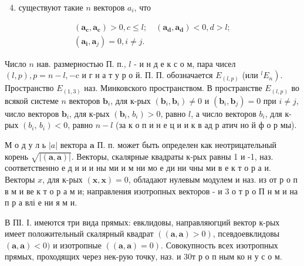 \documentclass[10pt]{article}
\begin{document}
\begin{enumerate}

  \setcounter{enumi}{3}

  \item существуют такие $n$ векторов $a_{i}$, что

\end{enumerate}



\[

\begin{gathered}

\left(\boldsymbol{a}_{\boldsymbol{c}}, \boldsymbol{a}_{\boldsymbol{c}}\right)>0, c \leqslant l ; \quad\left(\boldsymbol{a}_{\boldsymbol{d}}, \boldsymbol{a}_{\boldsymbol{d}}\right)<0, d>l ; \\

\left(\boldsymbol{a}_{\boldsymbol{i}}, \boldsymbol{a}_{j}\right)=0, i \neq j .

\end{gathered}

\]



Число $n$ нав. размерностью П. п., $l$ - и н д е к с о м, пара чисел $(l, p), p=n-l,-\mathrm{c}$ и г н а т у р о й. П. П. обозначается $E_{(l, p)}$ (или $\left.{ }^{l} E_{n}\right)$. Пространство $E_{(1,3)}$ наз. Минковского пространством. В пространстве $E_{(l, p)}$ во всякой системе $n$ векторов $\boldsymbol{b}_{i}$, для к-рых $\left(\boldsymbol{b}_{i}, \boldsymbol{b}_{i}\right) \neq 0$ и $\left(\boldsymbol{b}_{i}, \boldsymbol{b}_{j}\right)=0$ при $i \neq j$, число векторов $\boldsymbol{b}_{i}$, для к-рых $\left(\boldsymbol{b}_{i}\right.$, $\left.b_{i}\right)>0$, равно $l$, а число векторов $b_{i}$, для к-рых $\left(b_{i}\right.$, $\left.b_{i}\right)<0$, равно $n-l$ (за к о п и н е ц и и к в ад р атич но й ф о р мы).



М о д у л ь $|a|$ вектора $\boldsymbol{a}$ П. п. может быть определен как неотрицательный корень $\sqrt{|(\boldsymbol{a}, \boldsymbol{a})|}$. Векторы, скалярные квадраты к-рых равны 1 и -1, наз. соответственно е д и и и ны ми и м ни мо е ди ни чны ми в е к т о р а и. Векторы $x$, для к-рых $(\boldsymbol{x}, \boldsymbol{x})=0$, обладают нулевым модулем и наз. из от р о п в м и ве к т о р а м и; направления изотропных векторов - и 3 о т р о П н м и на п р а влі е ни я м и.



В ПІ. І. имеются три вида прямых: евклидовы, направляюгций вектор к-рых имеет положительный скалярный квадрат $((\boldsymbol{a}, \boldsymbol{a})>0)$, псевдоевклидовы $(\boldsymbol{a}, \boldsymbol{a})<0)$ и изотропные $((\boldsymbol{a}, \boldsymbol{a})=0)$. Совокупность всех изотропных прямых, проходящих через нек-рую точку, наз. и $30 \mathrm{т}$ р о п ным ко н у с о м.
\end{document}
